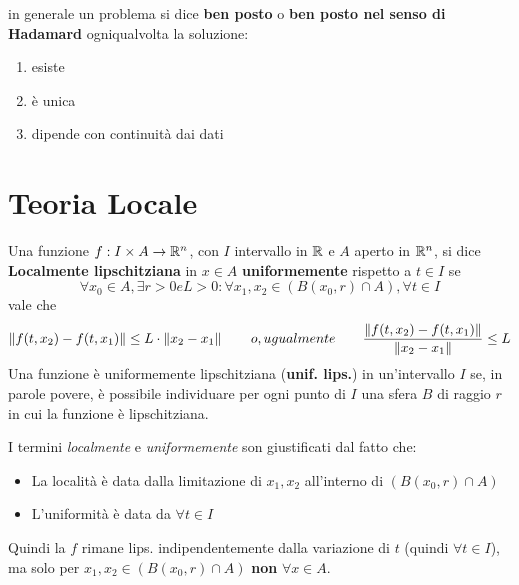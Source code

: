 \begin{observation}
	\label{obs:hadamard}
	in generale un problema si dice \textbf{ben posto} o \textbf{ben posto nel senso di Hadamard} ogniqualvolta la soluzione:
	\begin{enumerate}
		\item esiste
		\item è unica
		\item dipende con continuità dai dati
	\end{enumerate}
\end{observation}

\newpage
\section{Teoria Locale}
\begin{definition}
	\label{def:loc_lips}
	Una funzione $f:I\times A\to \mathbb{R}^n$, con $I$ intervallo in $\mathbb{R}$ e $A$ aperto in $\mathbb{R}^n$, si dice \textbf{Localmente lipschitziana} in $x\in A$ \textbf{uniformemente} rispetto a $t \in I$ se
	\[\forall x_0 \in A, \exists r>0 e L>0: \forall x_1,x_2 \in (B(x_0,r)\cap A), \forall t\in I\]
	vale che
	\[\left\|f(t,x_2)-f(t,x_1)\right\|\leq L\cdot\left\|x_2-x_1\right\|\qquad o, ugualmente\qquad\frac{\left\|f(t,x_2)-f(t,x_1)\right\|}{\left\|x_2-x_1\right\|}\leq L\]
	Una funzione è uniformemente lipschitziana (\textbf{unif. lips.}) in un'intervallo $I$ se, in parole povere, è possibile individuare per ogni punto di $I$ una sfera $B$ di raggio $r$ in cui la funzione è lipschitziana.
\end{definition}
\begin{note}
	I termini \textit{localmente} e \textit{uniformemente} son giustificati dal fatto che:
	\begin{itemize}
		\item La località è data dalla limitazione di $x_1,x_2$ all'interno di $(B(x_0,r)\cap A)$
		\item L'uniformità è data da $\forall t\in I$
	\end{itemize}
	Quindi la $f$ rimane lips. indipendentemente dalla variazione di $t$ (quindi $\forall t\in I$), ma solo per $x_1,x_2 \in (B(x_0,r)\cap A)$ \textbf{non} $\forall x\in A$.
\end{note}
